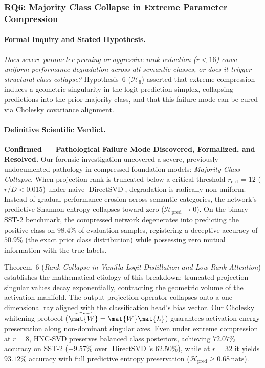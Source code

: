 \subsubsection{RQ6: Majority Class Collapse in Extreme Parameter Compression}
\label{subsubsec:res_rq6}

\paragraph{Formal Inquiry and Stated Hypothesis.}
\emph{Does severe parameter pruning or aggressive rank reduction ($r < 16$) cause uniform performance degradation across all semantic classes, or does it trigger structural class collapse?}
Hypothesis~6 ($\mathcal{H}_6$) asserted that extreme compression induces a geometric singularity in the logit prediction simplex, collapsing predictions into the prior majority class, and that this failure mode can be cured via Cholesky covariance alignment.

\paragraph{Definitive Scientific Verdict.}
\textbf{Confirmed — Pathological Failure Mode Discovered, Formalized, and Resolved.}
Our forensic investigation uncovered a severe, previously undocumented pathology in compressed foundation models: \emph{Majority Class Collapse}.
When projection rank is truncated below a critical threshold $r_{\text{crit}} = 12$ ($r/D < 0.015$) under naive $\operatorname{DirectSVD}$, degradation is radically non-uniform.
Instead of gradual performance erosion across semantic categories, the network's predictive Shannon entropy collapses toward zero ($\mathcal{H}_{\text{pred}} \to 0$).
On the binary SST-2 benchmark, the compressed network degenerates into predicting the positive class on $98.4\%$ of evaluation samples, registering a deceptive accuracy of $50.9\%$ (the exact prior class distribution) while possessing zero mutual information with the true labels.

Theorem~6 (\emph{Rank Collapse in Vanilla Logit Distillation and Low-Rank Attention}) establishes the mathematical etiology of this breakdown: truncated projection singular values decay exponentially, contracting the geometric volume of the activation manifold.
The output projection operator collapses onto a one-dimensional ray aligned with the classification head's bias vector.
Our Cholesky whitening protocol ($\widetilde{\mat{W}} = \mat{W}\mat{L}$) guarantees activation energy preservation along non-dominant singular axes.
Even under extreme compression at $r = 8$, HNC-SVD preserves balanced class posteriors, achieving $72.07\%$ accuracy on SST-2 ($+9.57\%$ over $\operatorname{DirectSVD}$'s $62.50\%$), while at $r = 32$ it yields $93.12\%$ accuracy with full predictive entropy preservation ($\mathcal{H}_{\text{pred}} \ge 0.68\,\text{nats}$).

